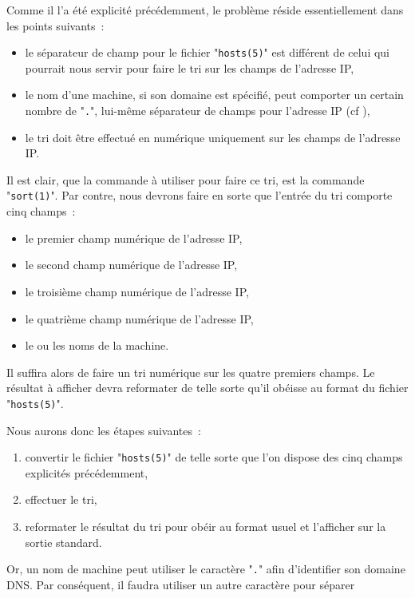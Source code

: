 Comme il l'a {\'e}t{\'e} explicit{\'e} pr{\'e}c{\'e}demment, le probl{\`e}me r{\'e}side essentiellement
dans les points suivants~:
\begin{itemize}
	\item	le s{\'e}parateur de champ pour le fichier "{\tt hosts(5)}" est
			diff{\'e}rent de celui qui pourrait nous servir pour faire le tri
			sur les champs de l'adresse IP,
	\item	le nom d'une machine, si son domaine est sp{\'e}cifi{\'e}, peut comporter
			un certain nombre de "{\tt .}", lui-m{\^e}me s{\'e}parateur de champs
			pour l'adresse IP (cf \cite{dns-bind}),
	\item	le tri doit {\^e}tre effectu{\'e} en num{\'e}rique uniquement sur les champs
			de l'adresse IP.
\end{itemize}

Il est clair, que la commande {\`a} utiliser pour faire ce tri, est la commande
"{\tt sort(1)}". Par contre, nous devrons faire en sorte que l'entr{\'e}e
du tri comporte cinq champs~:
\begin{itemize}
	\item	le premier champ num{\'e}rique de l'adresse IP,
	\item	le second champ num{\'e}rique de l'adresse IP,
	\item	le troisi{\`e}me champ num{\'e}rique de l'adresse IP,
	\item	le quatri{\`e}me champ num{\'e}rique de l'adresse IP,
	\item	le ou les noms de la machine.
\end{itemize}
Il suffira alors de faire un tri num{\'e}rique sur les quatre premiers champs.
Le r{\'e}sultat {\`a} afficher devra reformater de telle sorte qu'il ob{\'e}isse
au format du fichier "{\tt hosts(5)}".

Nous aurons donc les {\'e}tapes suivantes~:
\begin{enumerate}
	\item	convertir le fichier "{\tt hosts(5)}" de telle sorte que l'on
			dispose des cinq champs explicit{\'e}s pr{\'e}c{\'e}demment,
	\item	effectuer le tri,
	\item	reformater le r{\'e}sultat du tri pour ob{\'e}ir au format usuel et
			l'afficher sur la sortie standard.
\end{enumerate}

Or, un nom de machine peut utiliser le caract{\`e}re "{\tt .}" afin d'identifier
son domaine DNS. Par cons{\'e}quent, il faudra utiliser un autre caract{\`e}re pour
s{\'e}parer


